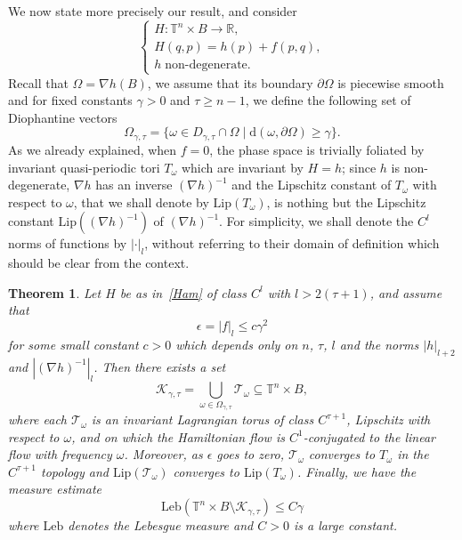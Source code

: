 \documentclass[JEP,XML,SOM,Unicode]{cedram}
\let\mathcal\mathscr
\let\sep\mid
\numberwithin{equation}{section}
\theoremstyle{plain}
\newtheorem{Main}{Theorem}
\theoremstyle{definition}
\newcommand{\R}{\mathbb{R}}
\newcommand\T{\mathbb T}
\begin{document}
We now state more precisely our result, and consider
\begin{equation}\label{Ham}
\begin{cases}
H : \T^n \times B \to \R, \\
H(q,p)=h(p)+f(p,q), \\
h \; \mbox{non-degenerate}.
\end{cases}
\tag{$*$}
\end{equation}
Recall that $\Omega=\nabla h(B)$, we assume that its boundary $\partial \Omega$ is piecewise smooth and for fixed constants $\gamma >0$ and $\tau \geq n-1$, we define the following set of Diophantine vectors
\begin{equation*}
\Omega_{\gamma,\tau}=\{\omega \in D_{\gamma,\tau} \cap \Omega \sep \mathrm{d}(\omega,\partial\Omega) \geq \gamma\}.
\end{equation*}
As we already explained, when $f=0$, the phase space is trivially foliated by invariant quasi-periodic tori $T_\omega$ which are invariant by $H=h$; since $h$ is non-degenerate, $\nabla h$ has an inverse $(\nabla h)^{-1}$ and the Lipschitz constant of $T_\omega$ with respect to $\omega$, that we shall denote by $\mathrm{Lip}(T_\omega)$, is nothing but the Lipschitz constant $\mathrm{Lip}((\nabla h)^{-1})$ of $(\nabla h)^{-1}$. For simplicity, we shall denote the $C^l$ norms of functions by $|{\cdot}|_l$, without referring to their domain of definition which should be clear from the context.

\begin{Main}\label{thm1}
Let $H$ be as in~\eqref{Ham} of class $C^l$ with $l>2(\tau+1)$, and assume that
\begin{equation}\label{seuila}
\epsilon=|f|_l \leq c \gamma^2
\end{equation}
for some small constant $c>0$ which depends only on $n$, $\tau$, $l$ and the norms $|h|_{l+2}$ and $|(\nabla h)^{-1}|_{l}$. Then there exists a set
\[ \mathcal{K}_{\gamma,\tau}=\bigcup_{\omega \in \Omega_{\gamma,\tau}}\mathcal{T}_\omega \subseteq \T^n \times B, \]
where each $\mathcal{T}_\omega$ is an invariant Lagrangian torus of class $C^{\tau+1}$, Lipschitz with respect to $\omega$, and on which the Hamiltonian flow is $C^{1}$-conjugated to the linear flow with frequency $\omega$. Moreover, as $\epsilon$ goes to zero, $\mathcal{T}_\omega$ converges to $T_\omega$ in the $C^{\tau+1}$ topology and $\mathrm{Lip}(\mathcal{T}_\omega)$ converges to $\mathrm{Lip}(T_\omega)$. Finally, we have the measure estimate
\[ \mathrm{Leb}(\T^n \times B \setminus \mathcal{K}_{\gamma,\tau}) \leq C\gamma \]
where $ \mathrm{Leb}$ denotes the Lebesgue measure and $C>0$ is a large constant.
\end{Main}
\end{document}
